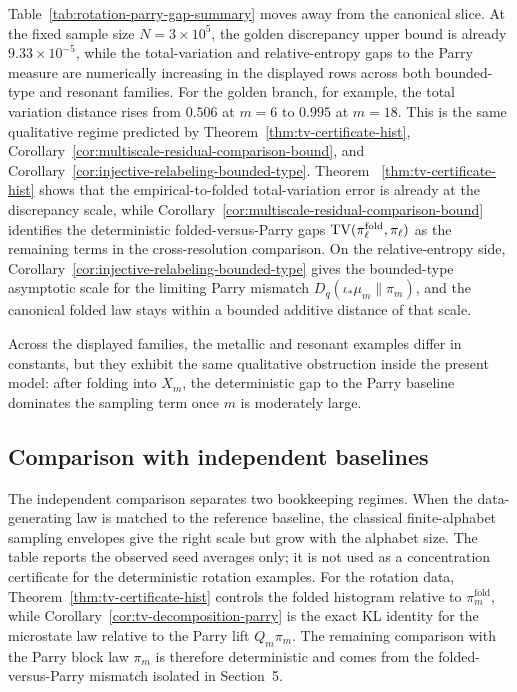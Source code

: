Table~\ref{tab:rotation-parry-gap-summary} moves away from the canonical
slice.  At the fixed sample size \(N=3\times 10^5\), the golden discrepancy
upper bound is already \(9.33\times 10^{-5}\), while the total-variation and
relative-entropy gaps to the Parry measure are numerically increasing in the
displayed rows across both bounded-type and resonant families.  For the
golden branch, for example, the total variation distance rises from \(0.506\)
at \(m=6\) to \(0.995\) at \(m=18\).  This is the same qualitative regime
predicted by
Theorem~\ref{thm:tv-certificate-hist},
Corollary~\ref{cor:multiscale-residual-comparison-bound}, and
Corollary~\ref{cor:injective-relabeling-bounded-type}.  Theorem
~\ref{thm:tv-certificate-hist} shows that the empirical-to-folded
total-variation error is already at the discrepancy scale, while
Corollary~\ref{cor:multiscale-residual-comparison-bound} identifies the
deterministic folded-versus-Parry gaps
\(\operatorname{TV}(\pi_\ell^{\mathrm{fold}},\pi_\ell)\) as the remaining terms in the
cross-resolution comparison.  On the relative-entropy side,
Corollary~\ref{cor:injective-relabeling-bounded-type} gives the bounded-type
asymptotic scale for the limiting Parry mismatch
\(D_q(\iota_*\mu_m\|\pi_m)\), and the canonical folded law stays within a
bounded additive distance of that scale.

Across the displayed families, the metallic and resonant examples differ in
constants, but they exhibit the same qualitative obstruction inside the
present model: after folding into \(X_m\), the deterministic gap to the Parry
baseline dominates the sampling term once \(m\) is moderately large.

\subsection{Comparison with independent baselines}



The independent comparison separates two bookkeeping regimes.  When the
data-generating law is matched to the reference baseline, the classical
finite-alphabet sampling envelopes give the right scale but grow with the
alphabet size.  The table reports the observed seed averages only; it is not
used as a concentration certificate for the deterministic rotation examples.
For the rotation data, Theorem~\ref{thm:tv-certificate-hist} controls the
folded histogram relative to \(\pi_m^{\mathrm{fold}}\), while
Corollary~\ref{cor:tv-decomposition-parry} is the exact KL identity for the
microstate law relative to the Parry lift \(Q_m\pi_m\).  The remaining
comparison with the Parry block law \(\pi_m\) is therefore deterministic and
comes from the folded-versus-Parry mismatch isolated in Section~5.


